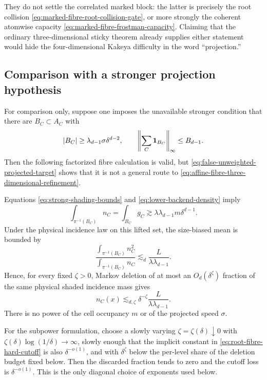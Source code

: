 \documentclass[11pt]{article}
\begin{document}
They do not settle the correlated marked block: the latter is precisely the
root collision \eqref{eq:marked-fibre-root-collision-gate}, or more strongly
the coherent atomwise capacity
\eqref{eq:marked-fibre-frostman-capacity}.  Claiming that the ordinary
three-dimensional sticky theorem already supplies either statement would hide
the four-dimensional Kakeya difficulty in
the word ``projection.''

\subsection{Comparison with a stronger projection hypothesis}

For comparison only, suppose one imposes the unavailable stronger condition
that there are \(B_C\subset A_C\) with
\begin{equation}\label{eq:lower-backend-density}
 |B_C|\ge\lambda_{d-1}\sigma\delta^{d-2},
 \qquad
 \left\|\sum_C{\bf1}_{B_C}\right\|_\infty\le B_{d-1}.
\end{equation}
Then the following factorized fibre calculation is valid, but
\eqref{eq:false-unweighted-projected-target} shows that it is not a general
route to \eqref{eq:affine-fibre-three-dimensional-refinement}.

Equations \eqref{eq:strong-shading-bounds} and
\eqref{eq:lower-backend-density} imply
\begin{equation}\label{eq:lifted-cell-incidence-mass}
 \int_{\pi^{-1}(B_C)}n_C
 =\int_{B_C}g_C
 \gtrsim\lambda\lambda_{d-1}m\delta^{d-1}.
\end{equation}
Under the physical incidence law on this lifted set, the size-biased mean is
bounded by
\begin{equation}\label{eq:size-biased-root-fibre}
 \frac{\int_{\pi^{-1}(B_C)}n_C^2}
      {\int_{\pi^{-1}(B_C)}n_C}
 \lesssim_d\frac{L}{\lambda\lambda_{d-1}}.
\end{equation}
Hence, for every fixed \(\zeta>0\), Markov deletion of at most an
\(O_d(\delta^\zeta)\) fraction of the same physical shaded incidence mass gives
\begin{equation}\label{eq:root-fibre-hard-cutoff}
 \boxed{
 n_C(x)\lesssim_{d,\zeta}
 \delta^{-\zeta}\frac{L}{\lambda\lambda_{d-1}}.}
\end{equation}
There is no power of the cell occupancy \(m\) or of the projected speed
\(\sigma\).

For the subpower formulation, choose a slowly varying
\(\zeta=\zeta(\delta)\downarrow0\) with
\(\zeta(\delta)\log(1/\delta)\to\infty\), slowly enough that the implicit
constant in \eqref{eq:root-fibre-hard-cutoff} is also \(\delta^{-o(1)}\), and
with \(\delta^\zeta\) below the per-level share of the deletion budget fixed
below.
Then the discarded fraction tends to zero and the cutoff loss is
\(\delta^{-o(1)}\).  This is the only diagonal choice of exponents used below.
\end{document}
